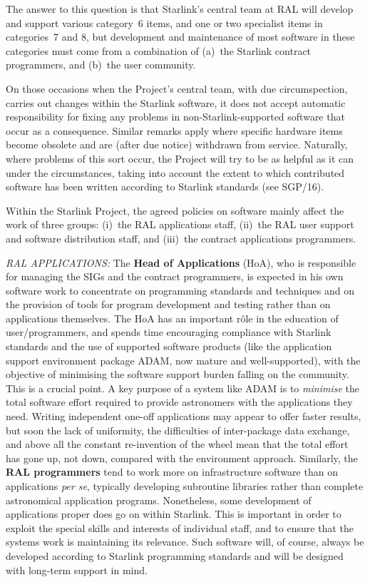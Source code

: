 The answer to this question is that Starlink's central team at RAL will
develop and support various category~6 items, and one or two specialist
items in categories~7 and 8, but development and
maintenance of most software in these categories
must come from a combination of
(a)~the Starlink contract programmers, and (b)~the user community.

On those occasions when the Project's central team,
with due circumspection, carries out
changes within the Starlink software,
it does not accept automatic responsibility
for fixing any problems in non-Starlink-supported
software that occur as a consequence.
Similar remarks apply where specific hardware items
become obsolete and are (after due notice) withdrawn from service.
Naturally, where problems of this sort occur, the Project will try
to be as helpful as it can under the circumstances, taking into
account the extent to which contributed software has been written
according to Starlink standards (see SGP/16).

Within the Starlink Project, the agreed policies on software
mainly affect the work of three groups:
(i)~the RAL applications staff, (ii)~the RAL
user support and software distribution staff, and (iii)~the
contract applications programmers.

{\it RAL APPLICATIONS:} \hspace{2ex} The {\bf Head 
of Applications} (HoA), who is responsible for
managing the SIGs and the contract programmers, is expected in
his own software work to concentrate on programming standards
and techniques and on the provision of tools for program
development and testing rather than on applications themselves.
The HoA has an important r\^{o}le in the
education of user/programmers, and spends time encouraging compliance
with Starlink standards and the
use of supported software products (like the application
support environment package ADAM, now mature and
well-supported), with
the objective of minimising the software support
burden falling on the community.  This is a crucial point.
A key purpose of a system like ADAM is to {\it minimise} the
total software effort required to provide astronomers with
the applications they need.  Writing independent
one-off applications may appear to offer faster results, but
soon the lack of uniformity, the difficulties of inter-package
data exchange, and above all the constant re-invention of the
wheel mean that the total effort has gone up, not down, compared
with the environment approach.
Similarly, the {\bf RAL programmers} tend to work more on infrastructure
software than on applications {\it per se}, typically developing
subroutine libraries rather than complete astronomical application
programs.  Nonetheless, some development of applications
proper does go on within Starlink.  This is
important in order to exploit the special skills and interests of
individual staff, and to ensure that the systems work is
maintaining its relevance.  Such software will, of course, always be
developed according to Starlink programming standards and
will be designed with long-term support in mind.

